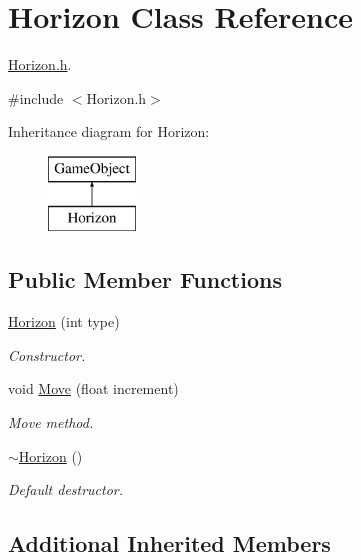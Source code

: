 \hypertarget{class_horizon}{}\section{Horizon Class Reference}
\label{class_horizon}


\mbox{\hyperlink{_horizon_8h_source}{Horizon.\+h}}.  




{\ttfamily \#include $<$Horizon.\+h$>$}

Inheritance diagram for Horizon\+:\begin{figure}[H]
\begin{center}
\leavevmode
\includegraphics[height=2.000000cm]{class_horizon}
\end{center}
\end{figure}
\subsection*{Public Member Functions}
\begin{DoxyCompactItemize}
\item 
\mbox{\hyperlink{class_horizon_adbdceabfe68477247ecb2c469e4d8187}{Horizon}} (int type)
\begin{DoxyCompactList}\small\item\em Constructor. \end{DoxyCompactList}\item 
void \mbox{\hyperlink{class_horizon_a845596ecfc2953f0d124e5fd0d7cb1d3}{Move}} (float increment)
\begin{DoxyCompactList}\small\item\em Move method. \end{DoxyCompactList}\item 
\mbox{\label{class_horizon_a4b917eb3365308d9ab6e1ab5c8891299}} 
\mbox{\hyperlink{class_horizon_a4b917eb3365308d9ab6e1ab5c8891299}{$\sim$\+Horizon}} ()
\begin{DoxyCompactList}\small\item\em Default destructor. \end{DoxyCompactList}\end{DoxyCompactItemize}
\subsection*{Additional Inherited Members}


